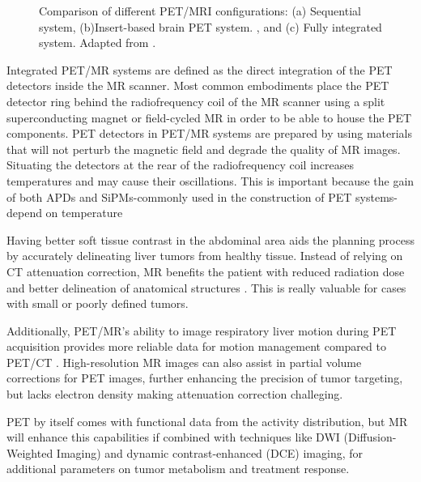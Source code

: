 \begin{multicols}{2}
\begin{figure}[H]
	\caption{Comparison of different PET/MRI configurations: (a) Sequential system, (b)Insert-based brain PET system. , and (c) Fully integrated system. Adapted from \cite{Kang2021}.}
	\label{fig:pet_mri_configurations}
\end{figure}

Integrated PET/MR systems are defined as the direct integration of the PET detectors inside the MR scanner. Most common embodiments place the PET detector ring behind the radiofrequency coil of the MR scanner using a split superconducting magnet or field-cycled MR in order to be able to house the PET components. PET detectors in PET/MR systems are prepared by using materials that will not perturb the magnetic field and degrade the quality of MR images. Situating the detectors at the rear of the radiofrequency coil increases temperatures and may cause their oscillations. This is important because the gain of both APDs and SiPMs-commonly used in the construction of PET systems-depend on temperature \cite{ziegler2013}%


Having better soft tissue contrast in the abdominal area aids the planning process by accurately delineating liver tumors from healthy tissue. Instead of relying on CT attenuation correction, MR benefits the patient with reduced radiation dose and better delineation of anatomical structures \cite{knesaurek2018}. This is really valuable for cases with small or poorly defined tumors.

Additionally, PET/MR’s ability to image respiratory liver motion during PET acquisition provides more reliable data for motion management compared to PET/CT \cite{knesaurek2018}. High-resolution MR images can also assist in partial volume corrections for PET images, further enhancing the precision of tumor targeting, but lacks electron density making attenuation correction challeging.

PET by itself comes with functional data from the activity distribution, but MR will enhance this capabilities if combined with techniques like DWI (Diffusion-Weighted Imaging) and dynamic contrast-enhanced (DCE) imaging, for additional parameters on tumor metabolism and treatment response. 


\end{multicols}
